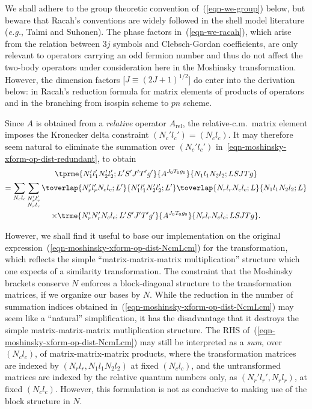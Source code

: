 \documentclass[aps,groupedaddress,onecolumn,11pt,floatfix]{revtex4}
\newcommand{\Arel}{A_\text{rel}}
\newcommand{\Nr}{N_r}
\newcommand{\Nc}{N_c}
\newcommand{\lr}{l_r}
\newcommand{\lc}{l_c}
\newcommand{\pref}[1]{(\ref{#1})}
\begin{document}
We shall adhere to the group theoretic convention
of~(\ref{eqn-we-group}) below, but beware that
Racah's conventions are widely followed in the shell model literature
(\textit{e.g.}, Talmi and Suhonen).  
The phase factors
in~(\ref{eqn-we-racah}), which arise
from the relation between $3j$ symbols and Clebsch-Gordan
coefficients, are only relevant to operators carrying an odd fermion
number and thus do not affect the two-body operators under
consideration here in the Moshinsky transformation.  However, the dimension factors
[$\hat{J}\equiv(2J+1)^{1/2}$] do enter into the derivation below: in
Racah's reduction formula for matrix elements of products of operators
and in the branching from isospin scheme to $pn$ scheme.  


Since $A$ is obtained from a \textit{relative} operator
$\Arel$, the relative-c.m.~matrix element imposes the Kronecker delta
constraint $(\Nc'\lc')=(\Nc\lc)$.  It may therefore seem natural to eliminate
the summation over $(\Nc'\lc')$ in~\ref{eqn-moshinsky-xform-op-dist-redundant}, to obtain
\begin{multline}
\label{eqn-moshinsky-xform-op-dist-NcmLcm}
\tprme{N_1' l_1' N_2' l_2';L'S'J'T'g'}{A^{J_0T_0g_0}}{N_1 l_1 N_2
  l_2;LSJTg}
\\
=\sum_{\Nc\lc}\sum_{\substack{\Nr'\lr'\\ \Nr\lr}}
\toverlap{\Nr'\lr'\Nc\lc;L'}{N_1'l_1'N_2'l_2';L'}
\toverlap{\Nr\lr\Nc\lc;L}{N_1l_1N_2l_2;L}
\\
\times
\trme{\Nr' \Nr' \Nc \lc;L'S'J'T'g'}{A^{J_0T_0g_0}}{\Nr \lr \Nc \lc; LSJTg}.
\end{multline}

However, we shall find it useful to base our implementation on the
original expression~\pref{eqn-moshinsky-xform-op-dist-NcmLcm} for the
transformation, which reflects the simple ``matrix-matrix-matrix
multiplication'' structure which one expects of a similarity
transformation.  The constraint that the Moshinsky brackets conserve
$N$ enforces a block-diagonal structure to the transformation
matrices, if we organize our bases by $N$.  While the reduction in
the number of summation indices obtained
in~\pref{eqn-moshinsky-xform-op-dist-NcmLcm} may seem like a
``natural'' simplification, it has the disadvantage that it destroys
the simple matrix-matrix-matrix mutliplication structure.  The RHS
of~\pref{eqn-moshinsky-xform-op-dist-NcmLcm} may still be interpreted
as a \textit{sum}, over $(\Nc\lc)$, of matrix-matrix-matrix products,
where the transformation matrices are indexed by
$(\Nr\lr,N_1l_1N_2l_2)$ at fixed $(\Nc\lc)$, and the untransformed
matrices are indexed by the relative quantum numbers only, as
$(\Nr'\lr',\Nr\lr)$, at fixed $(\Nc\lc)$.  However, this formulation
is not as conducive to making use of the block structure in $N$.
\end{document}

